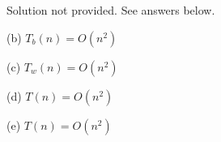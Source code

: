 
    Solution not provided.
    See answers below.
    
(b) $T_b(n) = O(n^2)$

(c) $T_w(n) = O(n^2)$

(d) $T(n) = O(n^2)$

(e) $T(n) = O(n^2)$
